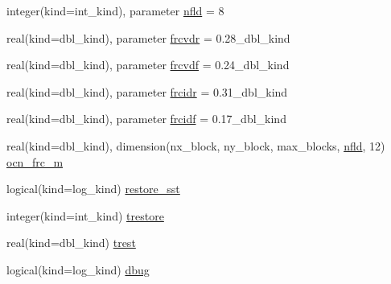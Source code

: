 \begin{DoxyCompactItemize}
\item 
integer(kind=int\_\-kind), parameter \hyperlink{namespaceice__forcing_ae1362a8a47b05e49acfce2142d98fdd5}{nfld} = 8
\item 
real(kind=dbl\_\-kind), parameter \hyperlink{namespaceice__forcing_a076bfda8ebb5a4f63d65ec503c12f0d4}{frcvdr} = 0.28\_\-dbl\_\-kind
\item 
real(kind=dbl\_\-kind), parameter \hyperlink{namespaceice__forcing_ab32ef53cee9c09cc217d6228c94dcf44}{frcvdf} = 0.24\_\-dbl\_\-kind
\item 
real(kind=dbl\_\-kind), parameter \hyperlink{namespaceice__forcing_a11540aeb60ff2b8a10675369dde6d6c3}{frcidr} = 0.31\_\-dbl\_\-kind
\item 
real(kind=dbl\_\-kind), parameter \hyperlink{namespaceice__forcing_ad4255bb85a309ae7a9ee20c1e951aa07}{frcidf} = 0.17\_\-dbl\_\-kind
\item 
real(kind=dbl\_\-kind), dimension(nx\_\-block, ny\_\-block, max\_\-blocks, \hyperlink{namespaceice__forcing_ae1362a8a47b05e49acfce2142d98fdd5}{nfld}, 12) \hyperlink{namespaceice__forcing_a726eacdcd2c76eb6ed122e4b1543d02d}{ocn\_\-frc\_\-m}
\item 
logical(kind=log\_\-kind) \hyperlink{namespaceice__forcing_a08581fb1de6afa9fa693b22a508447ff}{restore\_\-sst}
\item 
integer(kind=int\_\-kind) \hyperlink{namespaceice__forcing_a5a4e01d0d2029ae1b1f11eb0c3ce5d8c}{trestore}
\item 
real(kind=dbl\_\-kind) \hyperlink{namespaceice__forcing_a6a5e91929910782bb955be2569a01a35}{trest}
\item 
logical(kind=log\_\-kind) \hyperlink{namespaceice__forcing_a22e743605ad0e639e906f24289ef0cb1}{dbug}
\end{DoxyCompactItemize}


